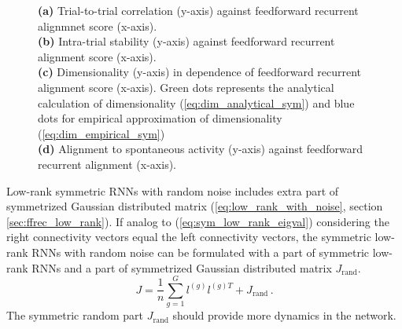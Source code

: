 \documentclass[11pt]{article}
\begin{document}
\begin{figure}[H]
{		\textbf{(a)} Trial-to-trial correlation (y-axis) against feedforward recurrent alignmnet score (x-axis).\\
		\textbf{(b)} Intra-trial stability (y-axis) against feedforward recurrent alignment score (x-axis). \\
		\textbf{(c)} Dimensionality (y-axis) in dependence of feedforward recurrent alignment score (x-axis). Green dots represents the analytical calculation of dimensionality (\ref{eq:dim_analytical_sym}) and blue dots for empirical approximation of dimensionality (\ref{eq:dim_empirical_sym})\\
		 \textbf{(d)} Alignment to spontaneous activity (y-axis) against feedforward recurrent alignment (x-axis).}
	 	\label{fig:result_sym_low_rank_with_noise}
		\end{figure}
	
	Low-rank symmetric RNNs with random noise includes extra part of symmetrized Gaussian distributed matrix (\ref{eq:low_rank_with_noise}, section \ref{sec:ffrec_low_rank}). If analog to (\ref{eq:sym_low_rank_eigval}) considering the right connectivity vectors equal the left connectivity vectors, the symmetric low-rank RNNs with random noise can be formulated with a part of symmetric low-rank RNNs and a part of symmetrized Gaussian distributed matrix $J_{\text{rand}}$. 
	\begin{equation} \label{eq:low_rank_sym_with_noise}
		J = \frac{1}{n}\sum_{g =1}^{G} l^{(g)} l^{(g)T} + J_{\text{rand}} \, .
	\end{equation}
	The symmetric random part $J_{\text{rand}}$ should provide more dynamics in the network. 
	
\end{document}
